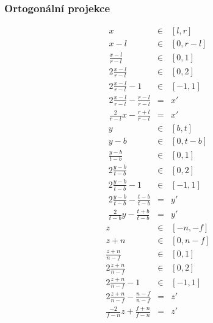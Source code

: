 \begin{frame}
\frametitle{Ortogonální projekce}
\begin{multicols}{3}
{\tiny
\begin{eqnarray*}
	x &\in& [l,r] \\
	x-l &\in& [0,r-l] \\
	\frac{x-l}{r-l} &\in& [0,1] \\
	2 \frac{x-l}{r-l} &\in& [0,2] \\
	2 \frac{x-l}{r-l}-1 &\in& [-1,1]\\
	2 \frac{x-l}{r-l}- \frac{r-l}{r-l} &=& x'\\
	\frac{2}{r-l}x - \frac{r+l}{r-l} &=& x'
\end{eqnarray*}
}
\vfill
{\tiny
\begin{eqnarray*}
	y &\in& [b,t] \\
	y-b &\in& [0,t-b] \\
	\frac{y-b}{t-b} &\in& [0,1] \\
	2 \frac{y-b}{t-b} &\in& [0,2] \\
	2 \frac{y-b}{t-b}-1 &\in& [-1,1]\\
	2 \frac{y-b}{t-b}- \frac{t-b}{t-b} &=& y'\\
	\frac{2}{t-b}y - \frac{t+b}{t-b} &=& y'
\end{eqnarray*}
}
\vfill
{\tiny
\begin{eqnarray*}
	z &\in& [-n,-f] \\
	z+n &\in& [0,n-f] \\
	\frac{z+n}{n-f} &\in& [0,1] \\
	2 \frac{z+n}{n-f} &\in& [0,2] \\
	2 \frac{z+n}{n-f}-1 &\in& [-1,1]\\
	2 \frac{z+n}{n-f}- \frac{n-f}{n-f} &=& z'\\
	\frac{-2}{f-n}z + \frac{f+n}{f-n} &=& z'
\end{eqnarray*}
}
\end{multicols}

\end{frame}

